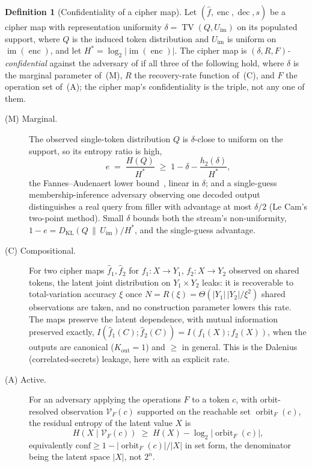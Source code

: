 \documentclass[11pt]{article}
\newcommand{\fhat}{\hat{f}}
\newcommand{\enc}{\operatorname{enc}}
\newcommand{\dec}{\operatorname{dec}}
\newcommand{\TV}{\operatorname{TV}}
\newcommand{\im}{\operatorname{im}}
\newcommand{\orbitF}{\operatorname{orbit}_F}
\theoremstyle{definition}
\newtheorem{definition}{Definition}
\theoremstyle{plain}
\theoremstyle{remark}
\begin{document}
\begin{definition}[Confidentiality of a cipher map]
\label{def:confidentiality}
Let $(\fhat, \enc, \dec, s)$ be a cipher map with representation uniformity
$\delta = \TV(Q, U_{\im})$ on its populated support, where $Q$ is the induced
token distribution and $U_{\im}$ is uniform on $\im(\enc)$, and let $H^{*} =
\log_2|\im(\enc)|$. The cipher map is \emph{$(\delta, R, F)$-confidential}
against the adversary of  if all three of the following hold,
where $\delta$ is the marginal parameter of~(M), $R$ the recovery-rate function
of~(C), and $F$ the operation set of~(A); the cipher map's confidentiality is
the triple, not any one of them.
\begin{description}
\item[\textmd{(M) Marginal.}] The observed single-token distribution $Q$ is
  $\delta$-close to uniform on the support, so its entropy ratio is high,
  \[
    e \;=\; \frac{H(Q)}{H^{*}} \;\ge\; 1 - \delta - \frac{h_2(\delta)}{H^{*}},
  \]
  the Fannes--Audenaert lower bound~\cite{fannes1973continuity,audenaert2007sharp},
  linear in $\delta$; and a single-guess
  membership-inference adversary observing one decoded output distinguishes a
  real query from filler with advantage at most $\delta/2$ (Le Cam's two-point
  method). Small $\delta$ bounds both the stream's non-uniformity, $1 - e =
  D_{\mathrm{KL}}(Q \,\|\, U_{\im})/H^{*}$, and the single-guess advantage.
\item[\textmd{(C) Compositional.}] For two cipher maps $\fhat_1, \fhat_2$ for
  $f_1 : X \to Y_1$, $f_2 : X \to Y_2$ observed on shared tokens, the latent
  joint distribution on $Y_1 \times Y_2$ leaks: it is recoverable to
  total-variation accuracy $\xi$ once $N = R(\xi) = \Theta(|Y_1|\,|Y_2|/\xi^2)$
  shared observations are taken, and no construction parameter lowers this rate.
  The maps preserve the latent dependence, with mutual information preserved
  exactly, $I(\fhat_1(C); \fhat_2(C)) = I(f_1(X); f_2(X))$, when the outputs are
  canonical ($K_{\mathrm{out}} = 1$) and $\ge$ in general. This is the Dalenius
  (correlated-secrets) leakage, here with an explicit rate.
\item[\textmd{(A) Active.}] For an adversary applying the operations $F$ to a
  token $c$, with orbit-resolved observation $\mathcal{V}_F(c)$ supported on the
  reachable set $\orbitF(c)$, the residual entropy of the latent value $X$ is
  \[
    H(X \mid \mathcal{V}_F(c)) \;\ge\; H(X) - \log_2|\orbitF(c)|,
  \]
  equivalently $\mathrm{conf} \ge 1 - |\orbitF(c)|/|X|$ in set form, the
  denominator being the latent space $|X|$, not $2^n$.
\end{description}
\end{definition}
\end{document}
